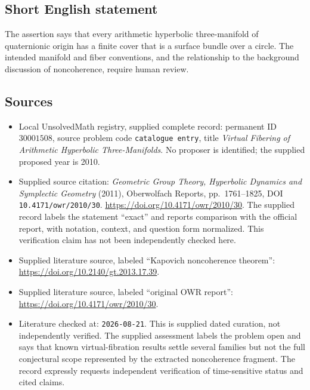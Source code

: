 \documentclass[11pt]{article}
\begin{document}
\subsection{Short English statement}
The assertion says that every arithmetic hyperbolic three-manifold of quaternionic origin has a finite cover that is a surface bundle over a circle. The intended manifold and fiber conventions, and the relationship to the background discussion of noncoherence, require human review.
\subsection{Sources}
\begin{itemize}
\item Local UnsolvedMath registry, supplied complete record: permanent ID \(30001508\), source problem code \texttt{catalogue entry}, title \emph{Virtual Fibering of Arithmetic Hyperbolic Three-Manifolds}. No proposer is identified; the supplied proposed year is 2010.
\item Supplied source citation: \emph{Geometric Group Theory, Hyperbolic Dynamics and Symplectic Geometry} (2011), Oberwolfach Reports, pp.~1761--1825, DOI \texttt{10.4171/owr/2010/30}. \url{https://doi.org/10.4171/owr/2010/30}. The supplied record labels the statement ``exact'' and reports comparison with the official report, with notation, context, and question form normalized. This verification claim has not been independently checked here.
\item Supplied literature source, labeled ``Kapovich noncoherence theorem'': \url{https://doi.org/10.2140/gt.2013.17.39}.
\item Supplied literature source, labeled ``original OWR report'': \url{https://doi.org/10.4171/owr/2010/30}.
\item Literature checked at: \texttt{2026-08-21}. This is supplied dated curation, not independently verified. The supplied assessment labels the problem open and says that known virtual-fibration results settle several families but not the full conjectural scope represented by the extracted noncoherence fragment. The record expressly requests independent verification of time-sensitive status and cited claims.
\end{itemize}
\end{document}
